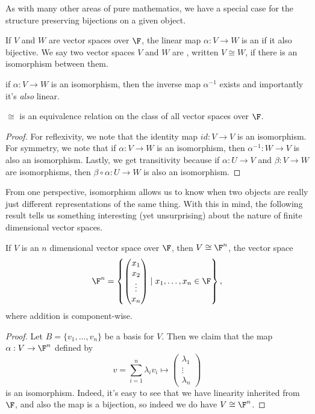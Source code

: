As with many other areas of pure mathematics, we have a special case for the structure preserving bijections on a given object.

\begin{definition}[Isomorphism]
    If $V$ and $W$ are vector spaces over $\F$, the linear map $\alpha: V \rightarrow W$ is an  if it also bijective. We say two vector spaces $V$ and $W$ are , written $V \cong W$, if there is an isomorphism between them.
\end{definition}

\begin{remark}
    if $\alpha:V \rightarrow W$ is an isomorphism, then the inverse map $\alpha^{-1}$ exists and importantly it's \emph{also} linear.
\end{remark}

\begin{lemma}
    $\cong$ is an equivalence relation on the class of all vector spaces over $\F$.
\end{lemma}
\begin{proof}
    For reflexivity, we note that the identity map $id: V \rightarrow V$ is an isomorphism. For symmetry, we note that if $\alpha: V \rightarrow W$ is an isomorphism, then $\alpha^{-1}: W \rightarrow V$ is also an isomorphism. Lastly, we get transitivity because if $\alpha: U \rightarrow V$ and $\beta: V \rightarrow W$ are isomorphisms, then $\beta \circ \alpha: U \rightarrow W$ is also an isomorphism.
\end{proof}

From one perspective, isomorphism allows us to know when two objects are really just different representations of the same thing. With this in mind, the following result tells us something interesting (yet unsurprising) about the nature of finite dimensional vector spaces.


\begin{theorem}
    If $V$ is an $n$ dimensional vector space over $\F$, then $V \cong \F^n$, the vector space
    $$
    \F^n = \left\{\begin{pmatrix}x_1 \\ x_2 \\ \vdots \\ x_n\end{pmatrix} \mid x_1, \dots, x_n \in \F \right\},
    $$
    where addition is component-wise.
\end{theorem}
\begin{proof}
    Let $B = \{v_1, \dots, v_n\}$ be a basis for $V$. Then we claim that the map $\alpha: V \rightarrow \F^n$ defined by 
    $$
    v = \sum_{i = 1}^n \lambda_i v_i \longmapsto \begin{pmatrix}\lambda_1 \\ \vdots \\ \lambda_n\end{pmatrix}
    $$
    is an isomorphism. Indeed, it's easy to see that we have linearity inherited from $\F$, and also the map is a bijection, so indeed we do have $V \cong \F^n$.
\end{proof}


